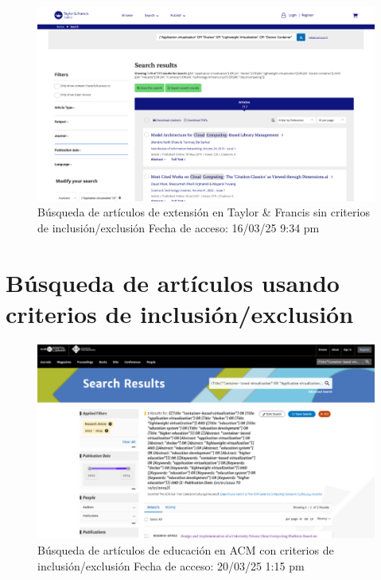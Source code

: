 \FloatBarrier\begin{figure}[H]
    \centering
    \includegraphics[width=\textwidth,keepaspectratio]{apendices/BD/sin-criterios/TF-ind.png}
    \caption{Búsqueda de artículos de extensión en Taylor \& Francis sin criterios de inclusión/exclusión
    Fecha de acceso: 16/03/25 9:34 pm}
\end{figure}
\FloatBarrier\section{Búsqueda de artículos usando criterios de inclusión/exclusión}\label{sec:busqueda-con-criterios}
\begin{figure}[H]
    \centering
    \includegraphics[width=\textwidth,keepaspectratio]{apendices/BD/criterios/ACM-ed.png}
    \caption{Búsqueda de artículos de educación en ACM con criterios de inclusión/exclusión
    Fecha de acceso: 20/03/25 1:15 pm
    }
\end{figure}
